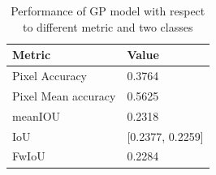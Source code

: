 	\begin{table}
	\begin{center}
		\begin{tabular}{ | l | p{12cm} |}
			\hline
			
			\cellcolor{purple!30}Metric & \cellcolor{purple!30}Value \\ \hline
			Pixel Accuracy & 0.3764 \\ \hline
			Pixel Mean accuracy & 0.5625  \\ \hline
			meanIOU & 0.2318 \\ \hline
			IoU & [0.2377, 0.2259] \\ \hline
			FwIoU & 0.2284 \\ \hline
			\hline
		\end{tabular}
		\caption{Performance of GP model with respect to different metric and two classes}
		\label{table:GP_conti_seq}
	\end{center}
	\end{table}
	

